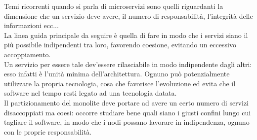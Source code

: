 Temi ricorrenti quando si parla di microservizi sono quelli riguardanti la dimensione che un servizio deve avere, il numero di responsabilità, l'integrità delle informazioni ecc...\\
La linea guida principale da seguire è quella di fare in modo che i servizi siano il più possibile indipendenti tra loro, favorendo coesione, evitando un eccessivo accoppiamento.\\
Un servizio per essere tale dev'essere rilasciabile in modo indipendente dagli altri: esso infatti è l'unità minima dell'architettura. Ognuno può potenzialmente utilizzare la propria tecnologia, cosa che favorisce l'evoluzione ed evita che il software nel tempo resti legato ad una tecnologia datata.\\
Il partizionamento del monolite deve portare ad avere un certo numero di servizi disaccoppiati ma coesi: occorre studiare bene quali siano i giusti confini lungo cui tagliare il software, in modo che i nodi possano lavorare in indipendenza, ognuno con le proprie responsabilità.
